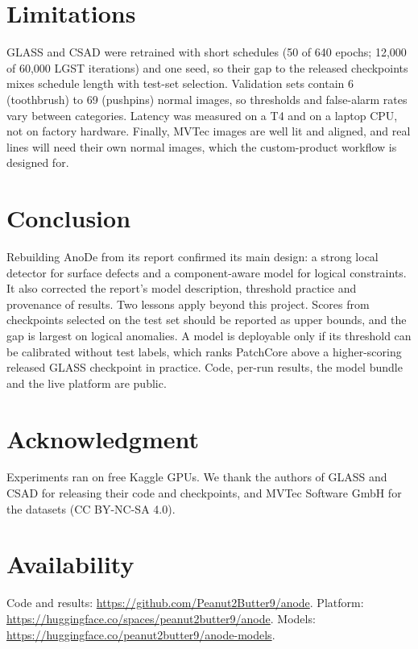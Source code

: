 \documentclass[conference]{IEEEtran}
\begin{document}
\section{Limitations}
GLASS and CSAD were retrained with short schedules (50 of 640 epochs; 12,000 of 60,000 LGST iterations) and one
seed, so their gap to the released checkpoints mixes schedule length with test-set selection. Validation sets contain 6 (toothbrush)
to 69 (pushpins) normal images, so thresholds and false-alarm rates vary between categories. Latency was measured
on a T4 and on a laptop CPU, not on factory hardware. Finally, MVTec images are well lit and aligned, and real lines
will need their own normal images, which the custom-product workflow is designed for.

\section{Conclusion}
Rebuilding AnoDe from its report confirmed its main design: a strong local detector for surface defects and a
component-aware model for logical constraints. It also corrected the report's model description, threshold
practice and provenance of results. Two lessons apply beyond this project. Scores from checkpoints selected on the
test set should be reported as upper bounds, and the gap is largest on logical anomalies. A model is deployable only
if its threshold can be calibrated without test labels, which ranks PatchCore above a higher-scoring released GLASS
checkpoint in practice. Code, per-run results, the model bundle and the live platform are public.

\section*{Acknowledgment}
Experiments ran on free Kaggle GPUs. We thank the authors of GLASS and CSAD for releasing their code and
checkpoints, and MVTec Software GmbH for the datasets (CC BY-NC-SA 4.0).

\section*{Availability}
Code and results: \url{https://github.com/Peanut2Butter9/anode}. Platform:
\url{https://huggingface.co/spaces/peanut2butter9/anode}. Models: \url{https://huggingface.co/peanut2butter9/anode-models}.
\end{document}
